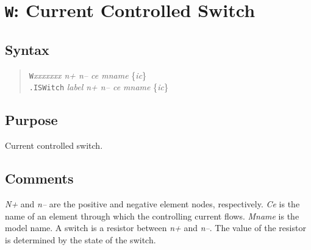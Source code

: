 %
%
%
%
\section{{\tt W}: Current Controlled Switch}
\subsection{Syntax}
\begin{verse}
{\tt W}{\it xxxxxxx n+ n-- ce mname} \{{\it ic}\}\\
{\tt .ISWitch} {\it label n+ n-- ce mname} \{{\it ic}\}
\end{verse}
\subsection{Purpose}

Current controlled switch.
\subsection{Comments}

{\it N+} and {\it n--} are the positive and negative element nodes,
respectively.  {\it Ce} is the name of an element through which
the controlling current flows.  {\it Mname} is the model name.  A
switch is a resistor between {\it n+} and {\it n--}.  The value of
the resistor is determined by the state of the switch.


